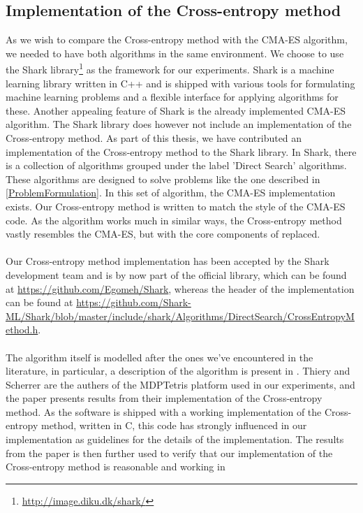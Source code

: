 \subsection{Implementation of the Cross-entropy method}

As we wish to compare the Cross-entropy method 
with the CMA-ES algorithm, we needed to have both algorithms
in the same environment. We choose to use the Shark 
library\footnote{\url{http://image.diku.dk/shark/}}
as the framework for our experiments. Shark is a machine 
learning library written in C++ and is shipped with various tools
for formulating machine learning problems and a flexible 
interface for applying algorithms for these. Another appealing
feature of Shark is the already implemented CMA-ES algorithm.
The Shark library does however not include an implementation of
the Cross-entropy method. As part of this thesis, we have contributed
an implementation of the Cross-entropy method to the Shark library.
In Shark, there is a collection of algorithms grouped under the label
'Direct Search' algorithms. These algorithms are designed to solve 
problems like the one described in \ref{ProblemFormulation}. In this
set of algorithm, the CMA-ES implementation exists. Our Cross-entropy method 
is written to match the style of the CMA-ES code. As the algorithm
works much in similar ways, the Cross-entropy method vastly resembles the CMA-ES, 
but with the core components of replaced.\\
\\
Our Cross-entropy method implementation has been accepted by the Shark development team and is 
by now part of the official library, which can be found at 
\url{https://github.com/Egomeh/Shark}, whereas the header of the 
implementation can be found at 
\url{https://github.com/Shark-ML/Shark/blob/master/include/shark/Algorithms/DirectSearch/CrossEntropyMethod.h}.\\
\\
The algorithm itself is modelled after the ones we've encountered 
in the literature, in particular, a description of the algorithm is 
present in \citep{thiery:09}. Thiery and Scherrer are the authers of the 
MDPTetris platform used in our experiments, and the paper presents 
results from their implementation of the Cross-entropy method. As the 
software is shipped with a working implementation of the Cross-entropy method, written in C,
this code has strongly influenced in our implementation as guidelines for
the details of the implementation. The results from the paper is then further used
to verify that our implementation of the Cross-entropy method is reasonable and working in 

